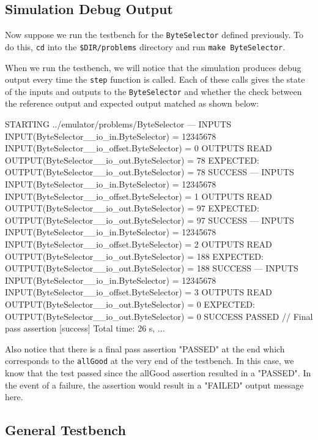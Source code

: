 \subsection{Simulation Debug Output}

Now suppose we run the testbench for the \verb+ByteSelector+ defined previously. To do this, \verb+cd+ into the \verb+$DIR/problems+ directory and run \verb+make ByteSelector+.

When we run the testbench, we will notice that the simulation produces debug output every time the \verb+step+ function is called. Each of these calls gives the state of the inputs and outputs to the \verb+ByteSelector+ and whether the check between the reference output and expected output matched as shown below:

\begin{bash}
STARTING ../emulator/problems/ByteSelector
---
INPUTS
  INPUT(ByteSelector__io_in.ByteSelector) = 12345678
  INPUT(ByteSelector__io_offset.ByteSelector) = 0
OUTPUTS
  READ OUTPUT(ByteSelector__io_out.ByteSelector) = 78
  EXPECTED: OUTPUT(ByteSelector__io_out.ByteSelector) = 78
  SUCCESS
---
INPUTS
  INPUT(ByteSelector__io_in.ByteSelector) = 12345678
  INPUT(ByteSelector__io_offset.ByteSelector) = 1
OUTPUTS
  READ OUTPUT(ByteSelector__io_out.ByteSelector) = 97
  EXPECTED: OUTPUT(ByteSelector__io_out.ByteSelector) = 97
  SUCCESS
---
INPUTS
  INPUT(ByteSelector__io_in.ByteSelector) = 12345678
  INPUT(ByteSelector__io_offset.ByteSelector) = 2
OUTPUTS
  READ OUTPUT(ByteSelector__io_out.ByteSelector) = 188
  EXPECTED: OUTPUT(ByteSelector__io_out.ByteSelector) = 188
  SUCCESS
---
INPUTS
  INPUT(ByteSelector__io_in.ByteSelector) = 12345678
  INPUT(ByteSelector__io_offset.ByteSelector) = 3
OUTPUTS
  READ OUTPUT(ByteSelector__io_out.ByteSelector) = 0
  EXPECTED: OUTPUT(ByteSelector__io_out.ByteSelector) = 0
  SUCCESS
PASSED   // Final pass assertion
[success] Total time: 26 s, ...
\end{bash}

Also notice that there is a final pass assertion "PASSED" at the end which corresponds to the \verb+allGood+ at the very end of the testbench. In this case, we know that the test passed since the allGood assertion resulted in a "PASSED". In the event of a failure, the assertion would result in a "FAILED" output message here.

\subsection{General Testbench}


